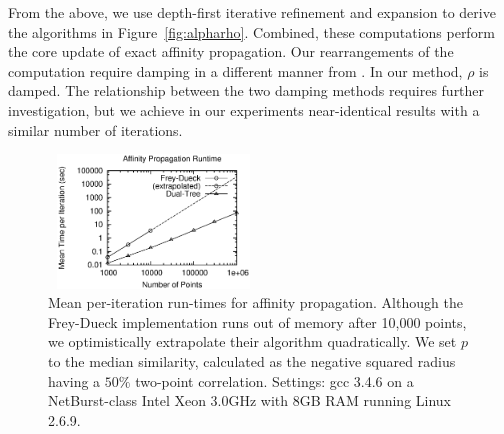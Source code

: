 \documentclass{article}
\newcommand{\killspace}{\vspace{-0.08in}}
\newcommand{\vecrho}{\vec{\rho}}
\newcommand{\vecalpha}{\vec{\alpha}}
\begin{document}
\killspace
From the above, we use depth-first iterative refinement and expansion to derive the algorithms in Figure~\ref{fig:alpharho}.
Combined, these computations perform the core update of exact affinity propagation.
Our rearrangements of the computation require damping in a different manner from \cite{affinity}.
In our method, $\rho$ is damped.
The relationship between the two damping methods requires further investigation, but we achieve in our experiments near-identical results with a similar number of iterations.

\begin{figure}[b]
  \begin{minipage}{2.6in}
    \includegraphics[width=2.2in,height=1.4in]{r-speed.ps}
  \end{minipage}
  \begin{minipage}{2.6in}
      \caption{\label{fig:speed}\footnotesize Mean per-iteration run-times for affinity propagation.
	Although the Frey-Dueck implementation runs out of memory after 10,000 points, we optimistically extrapolate their algorithm quadratically.
	We set $p$ to the median similarity, calculated as the negative squared radius having a $50\%$ two-point correlation.
	Settings: gcc 3.4.6 on a NetBurst-class Intel Xeon 3.0GHz with 8GB RAM running Linux 2.6.9.}
  \end{minipage}
  \killspace
\end{figure}
\end{document}
